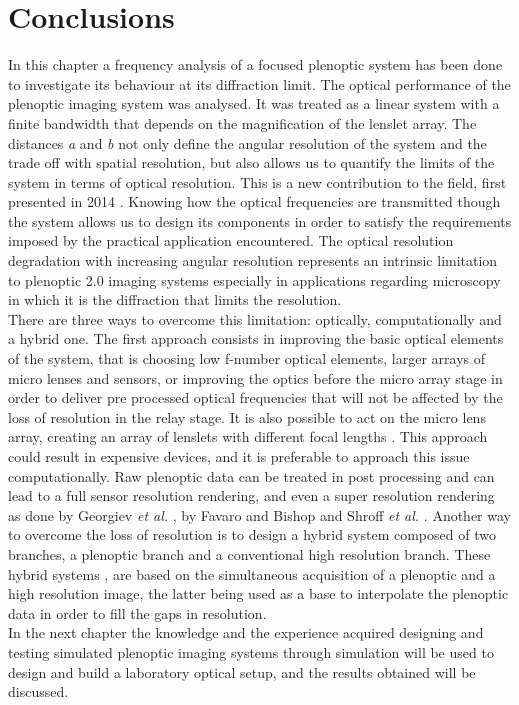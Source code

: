  \section{Conclusions}
 In this chapter a frequency analysis of a focused plenoptic system has been done to investigate its behaviour at its diffraction limit. The optical performance of the plenoptic imaging system was analysed. It was treated as a linear system with a finite bandwidth that depends on the magnification of the lenslet array. The distances \textit{a} and \textit{b} not only define the angular resolution of the system and the trade off with spatial resolution, but also allows us to quantify the limits of the system in terms of optical resolution. This is a new contribution to the field, first presented in 2014 \cite{turola2014wave}.  Knowing how the optical frequencies are transmitted though the system allows us to design its components in order to satisfy the requirements imposed by the practical application encountered. The optical resolution degradation with increasing angular resolution represents an intrinsic limitation to plenoptic 2.0 imaging systems especially in applications regarding microscopy in which it is the diffraction that limits the resolution.\\
 There are three ways to overcome this limitation: optically, computationally and a hybrid one. The first approach consists in improving the basic optical elements of the system, that is choosing low f-number optical elements, larger arrays of micro lenses and sensors, or improving the optics before the micro array stage in order to deliver pre processed optical frequencies that will not be affected by the loss of resolution in the relay stage. It is also possible to act on the micro lens array, creating an array of lenslets with different focal lengths \cite{georgiev2012multifocus}. This approach could result in expensive devices, and it is preferable to approach this issue computationally.  Raw plenoptic data can be treated in post processing and can lead to a full sensor resolution rendering, and even a super resolution rendering as done by Georgiev \textit{ et al.} \cite{georgiev2009superresolution,georgiev2012super,georgiev2011superresolution,georgiev2015plenoptic,georgiev2009high}, by Favaro and Bishop \cite{favaro2012split,bishop2012light,bishop2011full,bishop2009light} and Shroff \textit{et al.} \cite{shroff2012high,shroff2013image}. Another way to overcome the loss of resolution is to design a hybrid system composed of two branches, a plenoptic branch and a conventional high resolution branch. These hybrid systems \cite{lu2013high,boominathan2014improving}, are based on the simultaneous acquisition of a plenoptic and a high resolution image, the latter being used as a base to interpolate the plenoptic data in order to fill the gaps in resolution.\\
 In the next chapter the knowledge and the experience acquired designing and testing simulated plenoptic imaging systems through simulation will be used to design and build a laboratory optical setup, and the results obtained will be discussed.

   

 